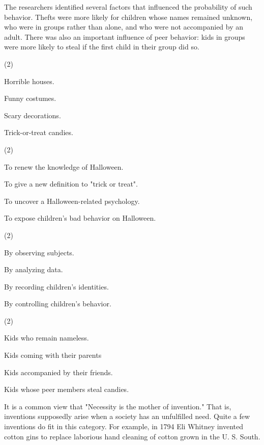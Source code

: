 \documentclass{英语试卷}
\begin{document}
\par The researchers identified several factors that influenced the probability of such behavior. Thefts were more likely for children whose names remained unknown, who were in groups rather than alone, and who were not accompanied by an adult. There was also an important influence of peer behavior: kids in groups were more likely to steal if the first child in their group did so.\par
{}
\begin{choices}(2)
  \item Horrible houses.
  \item Funny costumes.
  \item Scary decorations.
  \item Trick-or-treat candies.
\end{choices}
\begin{choices}(2)
  \item To renew the knowledge of Halloween.
  \item To give a new definition to "trick or treat".
  \item To uncover a Halloween-related psychology.
  \item To expose children's bad behavior on Halloween.
\end{choices}
\begin{choices}(2)
  \item By observing subjects.
  \item By analyzing data.
  \item By recording children's identities.
  \item By controlling children's behavior.
\end{choices}
\begin{choices}(2)
  \item Kids who remain nameless.
  \item Kids coming with their parents
  \item Kids accompanied by their friends.
  \item Kids whose peer members steal candies.
\end{choices}
\par It is a common view that "Necessity is the mother of invention." That is, inventions supposedly arise when a society has an unfulfilled need. Quite a few inventions do fit in this category. For example, in 1794 Eli Whitney invented cotton gins to replace laborious hand cleaning of cotton grown in the U. S. South.\par
\end{document}
